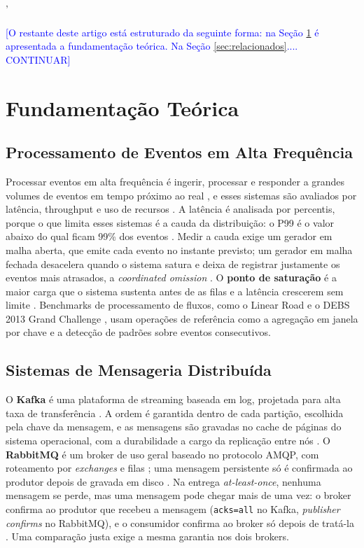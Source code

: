 '\documentclass[12pt]{article}
\newcommand{\todoe}[1]{\textcolor{blue}{[#1]}}
\begin{document}
\todoe{O restante deste artigo está estruturado da seguinte forma: na Seção \ref{sec:fundamentacao} é apresentada a fundamentação teórica. Na Seção \ref{sec:relacionados}....  CONTINUAR}


\section{Fundamentação Teórica}
\label{sec:fundamentacao}

\subsection{Processamento de Eventos em Alta Frequência}

Processar eventos em alta frequência é ingerir, processar e responder a grandes volumes de
eventos em tempo próximo ao real \cite{luckham:2011,cugola:2012}, e esses sistemas são
avaliados por latência, throughput e uso de recursos \cite{jain:1991,fu:2021}. A latência
é analisada por percentis, porque o que limita esses sistemas é a cauda da distribuição: o
P99 é o valor abaixo do qual ficam 99\% dos eventos \cite{fu:2021}. Medir a cauda exige um
gerador em malha aberta, que emite cada evento no instante previsto; um gerador em malha
fechada desacelera quando o sistema satura e deixa de registrar justamente os eventos mais
atrasados, a \textit{coordinated omission} \cite{tene:2015}. O \textbf{ponto de
saturação} é a maior carga que o sistema sustenta antes de as filas e a latência crescerem
sem limite \cite{jain:1991}. Benchmarks de processamento de fluxos, como o Linear Road
\cite{arasu:2004} e o DEBS 2013 Grand Challenge \cite{mutschler:2013}, usam operações de
referência como a agregação em janela por chave e a detecção de padrões sobre eventos
consecutivos.

\subsection{Sistemas de Mensageria Distribuída}

O \textbf{Kafka} é uma plataforma de streaming baseada em log, projetada para alta taxa
de transferência \cite{kreps:2011}. A ordem é garantida dentro de cada partição, escolhida
pela chave da mensagem, e as mensagens são gravadas no cache de páginas do sistema
operacional, com a durabilidade a cargo da replicação entre nós \cite{kafka:docs}. O
\textbf{RabbitMQ} é um broker de uso geral baseado no protocolo AMQP, com roteamento por
\textit{exchanges} e filas \cite{videla:2012}; uma mensagem persistente só é confirmada ao
produtor depois de gravada em disco \cite{rabbitmq:docs}. Na entrega
\textit{at-least-once}, nenhuma mensagem se perde, mas uma mensagem pode chegar mais de
uma vez: o broker confirma ao produtor que recebeu a mensagem (\texttt{acks=all} no Kafka,
\textit{publisher confirms} no RabbitMQ), e o consumidor confirma ao broker só depois de
tratá-la \cite{kafka:docs,rabbitmq:docs}. Uma comparação justa exige a mesma garantia nos
dois brokers.
\end{document}

